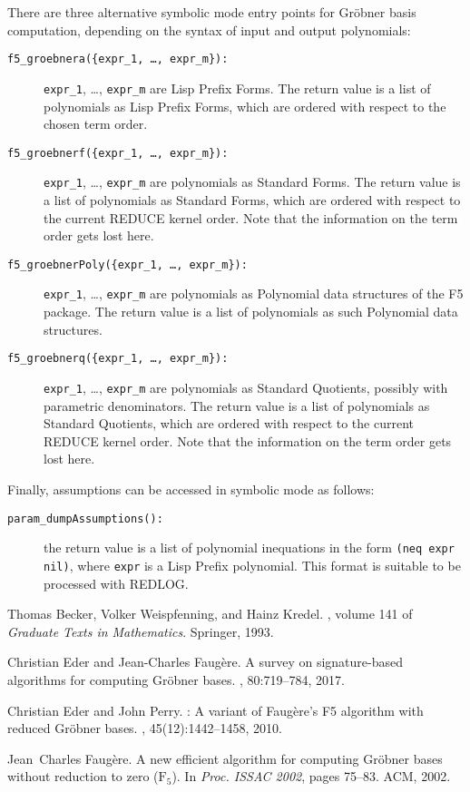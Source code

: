 \documentclass{article}
\newcommand{\grobner}{Gr\"obner}
\newcommand{\code}[1]{\texttt{#1}}
\begin{document}
There are three alternative symbolic mode entry points for \grobner{} basis computation, depending
on the syntax of input and output polynomials:
\begin{description}
\item[\code{f5\_groebnera(\{expr\_1, \ldots, expr\_m\}):}] \code{expr\_1}, \dots, \code{expr\_m} are
Lisp Prefix Forms. The return value is a list of polynomials as Lisp Prefix Forms, which are ordered
with respect to the chosen term order.
%
\item[\code{f5\_groebnerf(\{expr\_1, \ldots, expr\_m\}):}] \code{expr\_1}, \dots, \code{expr\_m} are
polynomials as Standard Forms. The return value is a list of polynomials as Standard Forms, which
are ordered with respect to the current REDUCE kernel order. Note that the information on the term
order gets lost here.
%
\item[\code{f5\_groebnerPoly(\{expr\_1, \ldots, expr\_m\}):}] \code{expr\_1}, \dots, \code{expr\_m}
are polynomials as Polynomial data structures of the F5 package. The return value is a list of
polynomials as such Polynomial data structures.
%
\item[\code{f5\_groebnerq(\{expr\_1, \ldots, expr\_m\}):}] \code{expr\_1}, \dots, \code{expr\_m} are
polynomials as Standard Quotients, possibly with parametric denominators. The return value is a list
of polynomials as Standard Quotients, which are ordered with respect to the current REDUCE kernel
order. Note that the information on the term order gets lost here.
\end{description}

Finally, assumptions can be accessed in symbolic mode as follows:
\begin{description}
\item[\code{param\_dumpAssumptions():}] the return value is a list of polynomial inequations in the
form \code{(neq expr nil)}, where \code{expr} is a Lisp Prefix polynomial. This format is suitable
to be processed with REDLOG.
\end{description}

\begin{thebibliography}{BWK93}

Thomas Becker, Volker Weispfenning, and Hainz Kredel.
, volume 141 of {\em Graduate Texts in
  Mathematics}.
\newblock Springer, 1993.

Christian Eder and Jean-Charles Faugère.
\newblock A survey on signature-based algorithms for computing {G}röbner
  bases.
, 80:719--784, 2017.

Christian Eder and John Perry.
: A variant of {F}aug{\`{e}}re's {F5} algorithm with reduced
  {G}r{\"o}bner bases.
, 45(12):1442--1458, 2010.

Jean~Charles Faugère.
\newblock A new efficient algorithm for computing {G}röbner bases without
  reduction to zero ($\textrm{{F}}_5$).
\newblock In {\em Proc. ISSAC 2002}, pages 75--83. ACM, 2002.

\end{thebibliography}

% 
% 
\end{document}
